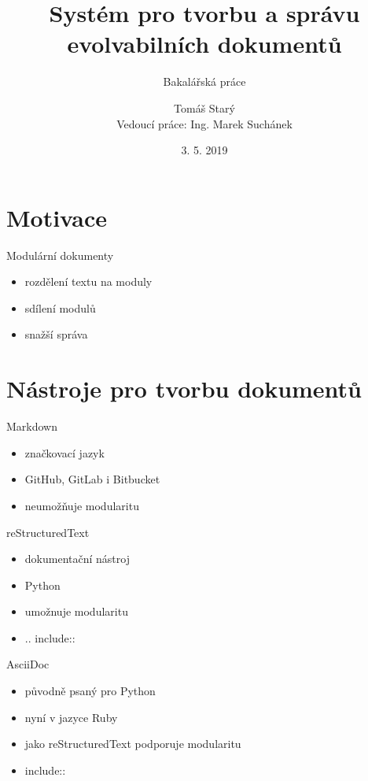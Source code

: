 \documentclass[czech,aspectratio=169]{beamer}
\title[Systém pro tvorbu a správu evolvabilních dokumentů]{Systém pro tvorbu a správu evolvabilních dokumentů}
\subtitle{Bakalářská práce}
\institute[FIT ČVUT v Praze]{Fakulta informačních technologií \\ České vysoké učení technické v Praze}
\author[T. Starý]{Tomáš Starý \\ Vedoucí práce: Ing. Marek Suchánek}
\date{3. 5. 2019}
\begin{document}
\begin{frame}
    \titlepage{} %
\end{frame}

\begin{frame}
    \tableofcontents
\end{frame}

\section{Motivace}
    \begin{frame}
        \tableofcontents[currentsection]
    \end{frame}
    \begin{frame}{Modulární dokumenty}
        \begin{itemize}
            \item rozdělení textu na moduly \pause{}
            \item sdílení modulů \pause{}
            \item snažší správa
        \end{itemize}
    \end{frame}

\section{Nástroje pro tvorbu dokumentů}
    \begin{frame}
        \tableofcontents[currentsection]
    \end{frame}
    \begin{frame}{Markdown}
        \begin{itemize}
            \item značkovací jazyk \pause{}
            \item GitHub, GitLab i Bitbucket \pause{}
            \item neumožňuje modularitu
        \end{itemize}
    \end{frame}
    \begin{frame}{reStructuredText}
        \begin{itemize}
            \item dokumentační nástroj \pause{}
            \item Python \pause{}
            \item umožnuje modularitu \pause{}
            \item .. include::
        \end{itemize}
    \end{frame}
    \begin{frame}{AsciiDoc}
        \begin{itemize}
            \item původně psaný pro Python \pause{}
            \item nyní v jazyce Ruby \pause{}
            \item jako reStructuredText podporuje modularitu \pause{}
            \item include::
        \end{itemize}
    \end{frame}
\end{document}

